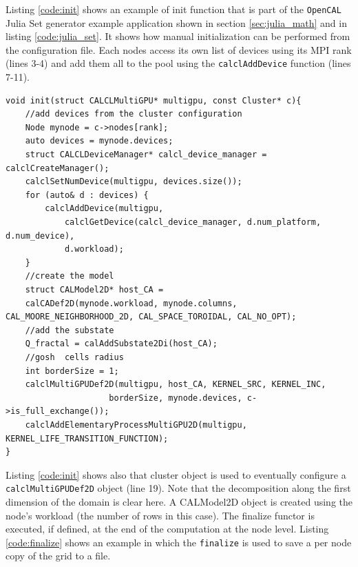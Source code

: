 Listing \ref{code:init} shows an example of init function that is part of the \texttt{OpenCAL} Julia Set generator example application shown in section \ref{sec:julia_math} and in listing \ref{code:julia_set}. It shows how manual initialization can be performed from the configuration file. Each nodes access its own list of devices using its MPI rank (lines 3-4)  and add them all to the pool using the \texttt{calclAddDevice} function (lines 7-11).
\begin{lstlisting}
void init(struct CALCLMultiGPU* multigpu, const Cluster* c){
    //add devices from the cluster configuration
    Node mynode = c->nodes[rank];
    auto devices = mynode.devices;
    struct CALCLDeviceManager* calcl_device_manager = calclCreateManager();
    calclSetNumDevice(multigpu, devices.size());
    for (auto& d : devices) {
        calclAddDevice(multigpu, 
            calclGetDevice(calcl_device_manager, d.num_platform, d.num_device),
            d.workload);
    }
    //create the model    
    struct CALModel2D* host_CA =
    calCADef2D(mynode.workload, mynode.columns, CAL_MOORE_NEIGHBORHOOD_2D, CAL_SPACE_TOROIDAL, CAL_NO_OPT);
    //add the substate
    Q_fractal = calAddSubstate2Di(host_CA);
    //gosh  cells radius
    int borderSize = 1;
    calclMultiGPUDef2D(multigpu, host_CA, KERNEL_SRC, KERNEL_INC,
                     borderSize, mynode.devices, c->is_full_exchange());
    calclAddElementaryProcessMultiGPU2D(multigpu,     KERNEL_LIFE_TRANSITION_FUNCTION);
}
\end{lstlisting}
Listing \ref{code:init} shows also that cluster object is used to eventually configure a \texttt{calclMultiGPUDef2D} object (line 19). 
Note that the decomposition along the first dimension of the domain is clear here. A CALModel2D object is created using the node's workload (the number of rows in this case). The finalize functor is executed, if defined, at the end of the computation at the node level. Listing \ref{code:finalize} shows an example in which the \texttt{finalize} is used to save a per node copy of the grid to a file.
